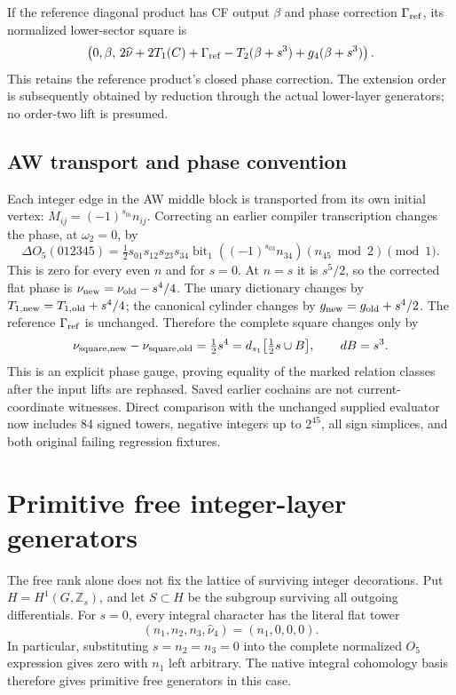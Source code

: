 \documentclass[11pt]{article}
\newcommand{\dd}{d_{s_1}}
\begin{document}
If the reference diagonal product has CF output $\beta$ and phase
correction $\Gamma_{\rm ref}$, its normalized lower-sector square is
\begin{equation}
 \left(0,\beta,\,
 2\widehat\nu+2T_1(C)+\Gamma_{\rm ref}
 -T_2(\beta+s^3)+g_4(\beta+s^3)\right).
\end{equation}
This retains the reference product's closed phase correction. The
extension order is subsequently obtained by reduction through the actual
lower-layer generators; no order-two lift is presumed.

\subsection{AW transport and phase convention}
Each integer edge in the AW middle block is transported from its own
initial vertex: $M_{ij}=(-1)^{s_{0i}}n_{ij}$. Correcting an earlier
compiler transcription changes the phase, at $\omega_2=0$, by
\begin{equation}
 \Delta O_5(012345)=\tfrac12 s_{01}s_{12}s_{23}s_{34}
 \operatorname{bit}_1\!\left((-1)^{s_{03}}n_{34}\right)
 (n_{45}\bmod2)\pmod1.
\end{equation}
This is zero for every even $n$ and for $s=0$. At $n=s$ it is
$s^5/2$, so the corrected flat phase is $\nu_{\rm new}=\nu_{\rm old}-s^4/4$.
The unary dictionary changes by $T_{1,\rm new}=T_{1,\rm old}+s^4/4$;
the canonical cylinder changes by $g_{\rm new}=g_{\rm old}+s^4/2$.
The reference $\Gamma_{\rm ref}$ is unchanged. Therefore the complete
square changes only by
\begin{equation}
 \nu_{\rm square,new}-\nu_{\rm square,old}
 =\tfrac12s^4=\dd\bigl[\tfrac12s\cup B\bigr],\qquad dB=s^3.
\end{equation}
This is an explicit phase gauge, proving equality of the marked relation
classes after the input lifts are rephased. Saved earlier cochains are
not current-coordinate witnesses. Direct comparison with the unchanged
supplied evaluator now includes 84 signed towers, negative integers up to
$2^{45}$, all sign simplices, and both original failing regression fixtures.

\section{Primitive free integer-layer generators}
The free rank alone does not fix the lattice of surviving integer
decorations. Put $H=H^1(G,\mathbb Z_s)$, and let $S\subset H$ be the
subgroup surviving all outgoing differentials. For $s=0$, every integral
character has the literal flat tower
\begin{equation}
 (n_1,n_2,n_3,\widehat\nu_4)=(n_1,0,0,0).
\end{equation}
In particular, substituting $s=n_2=n_3=0$ into the complete normalized
$O_5$ expression gives zero with $n_1$ left arbitrary. The native integral
cohomology basis therefore gives primitive free generators in this case.
\end{document}

